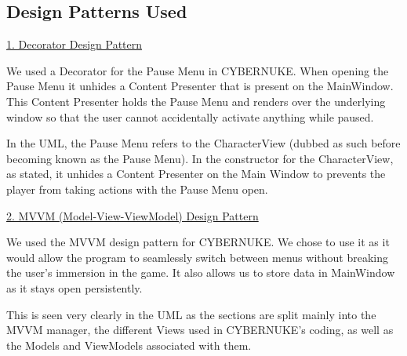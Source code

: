 \documentclass[10pt,conference,onecolumn,compsoc]{IEEEtran}
\begin{document}
\subsection{Design Patterns Used}
\underline{1. Decorator Design Pattern}
\vspace{5px}

We used a Decorator for the Pause Menu in CYBERNUKE. When opening the Pause Menu it unhides a Content Presenter that is present on the MainWindow. This Content Presenter holds the Pause Menu and renders over the underlying window so that the user cannot accidentally activate anything while paused.

In the UML, the Pause Menu refers to the CharacterView (dubbed as such before becoming known as the Pause Menu). In the constructor for the CharacterView, as stated, it unhides a Content Presenter on the Main Window to prevents the player from taking actions with the Pause Menu open.

\underline{2. MVVM (Model-View-ViewModel) Design Pattern}
\vspace{5px}

We used the MVVM design pattern for CYBERNUKE. We chose to use it as it would allow the program to seamlessly switch between menus without breaking the user's immersion in the game. It also allows us to store data in MainWindow as it stays open persistently.

This is seen very clearly in the UML as the sections are split mainly into the MVVM manager, the different Views used in CYBERNUKE's coding, as well as the Models and ViewModels associated with them.


\end{document}
